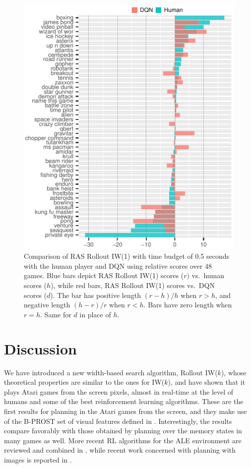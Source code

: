 \documentclass[letterpaper]{article}
\begin{document}
\begin{figure}[t]
  \centering
  \includegraphics[width=\columnwidth]{110-15-halfsec-bars}
  \caption{Comparison of RAS Rollout IW(1) with time budget of 0.5 seconds with
    the human player and DQN using relative scores over 48 games.
    Blue bars depict RAS Rollout IW(1) scores ($r)$ vs.\ human scores ($h$), while
    red bars, RAS Rollout IW(1) scores vs.\ DQN scores ($d$). The bar has positive length $(r-h)/h$
    when $r>h$, and negative length $(h-r)/r$ when $r<h$. Bars have zero length when $r=h$.
    Same for $d$ in place of $h$.
  }
  \label{fig:110:bars:half}
\end{figure}


\section{Discussion}

We have introduced a new width-based search algorithm, Rollout IW($k$), whose
theoretical properties are similar to the ones for IW($k$), and have shown that
it plays Atari games from the screen pixels, almost in real-time at the level
of humans and some of the best reinforcement learning algorithms.
These are the first results for planning in the Atari games from the screen, and
they make use of the B-PROST set of visual features defined in \cite{shallow}.
Interestingly, the results compare favorably with those obtained by planning over
the memory states in many games as well. More recent RL algorithms for the ALE
environment are reviewed and combined in \cite{silver:rainbow}, while recent work
concerned with planning with images is reported in \cite{fukunaga:planning-images}.
\end{document}
